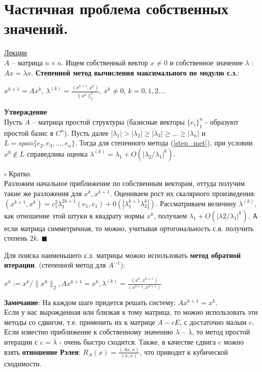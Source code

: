 \documentclass[specialist, subf, href, colorlinks=true, 12pt, times, mtpro, final]{disser}
\theoremstyle{definition}
\begin{document}
{\section {Частичная проблема собственных значений.}
    \hyperlink {lects.78}{Лекции}\\
    $A$ \--- матрица $n\times n$. Ищем собственный вектор $x \ne 0$ и собственное значение $\lambda$ : $Ax = \lambda x$.
    \textbf{Степенной метод вычисления максимального по модулю с.з.}:\\
    \begin{center}
    \label{step_met}
    $x^{k+1} = Ax^k$,  $\lambda^{(k)} = \frac{(x^{k+1}, x^k)}{\|x^k\|^2_2}$, $x^k \ne 0$,  $k=0,1,2...$.
    \end{center}
    \textbf{Утверждение}\\
    Пусть $A$ \--- матрица простой структуры (базисные векторы $\{e_i\}^n_1$ - образуют простой базис в $C^n$). Пусть далее $|\lambda_1| > |\lambda_2| \geq |\lambda_3| \geq ... \geq |\lambda_n|$ и $L=span\{e_2,e_3,...,e_n\}$. Тогда для степенного метода (\ref{step_met}), при условии $x^0 \notin L$ справедлива оценка $\lambda^{(k)} = \lambda_1 + O(|\lambda_2/\lambda_1|^k)$.
    
    \noindent$\square$ Кратко.\\
    Разложим начальное приближение по собственным векторам, оттуда получим такие же разложения для $x^k, x^{k+1}$. Оцениваем рост их скалярного произведения: $(x^{k+1}, x^k) = c^2_1 \lambda^{2k+1}_1 (e_1, e_1) + 0(|\lambda^{k+1}_1\lambda^k_2|)$.
    Рассматриваем величину $\lambda^{(k)}$, как отношение этой штуки к квадрату нормы $x^k$,  получаем $\lambda_1 + O(|\lambda2/\lambda_1|^k)$. А если матрица симметричная, то можно, учитывая ортогональность с.в. получить степень $2k$. 
    $\blacksquare$
    
    
    Для поиска наименьшего с.з. матрицы можно использовать \textbf{метод обратной итерации}. (степенной метод для $A^{-1}$):\\
    \begin{center}
    $x^k := x^k / \|x^k\|_2, Ax^{k+1} = x^k, \lambda^{(k)} = \frac{(x^k, x^{k+1})}{(x^{k+1}, x^{k+1})}$
    \end{center}
    
    \noindent\textbf{Замечание}: На каждом шаге придется решать систему: $Ax^{k+1} = x^k$.
\\
Если у нас вырожденная или близкая к тому матрица, то можно использовать эти методы со сдвигом, т.е. применить их к матрице $A-cE$, с достаточно малым $c$.  Если известно приближение к собственному значению $\lambda$ \--- $\overline{\lambda}$, то метод простой итерации с $c = \overline{\lambda}$ - очень быстро сходится. Также, в качестве сдвига $c$ можно взять \textbf{отношение Рэлея}: $R_A(x) = \frac{(Ax, x)}{(x, x)}$, что приводит к кубической сходимости.
    
}
\end{document}
